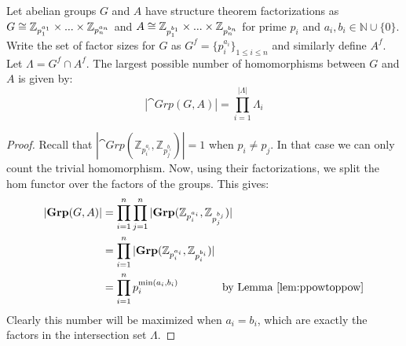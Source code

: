 \begin{lemma}
Let abelian groups $G$ and $A$ have structure theorem factorizations as $G\cong\mathbb{Z}_{p_1^{a_1}} \times ...\times\mathbb{Z}_{p_n^{a_n}}$ and $A\cong\mathbb{Z}_{p_1^{b_1}} \times ...\times\mathbb{Z}_{p_n^{b_n}}$ for prime $p_i$ and $a_i,b_i\in \mathbb{N}\cup\{0\}$. Write the set of factor sizes for $G$ as $G^f = \{p_i^{a_i}\}_{1\le i\le n}$ and similarly define $A^f$. Let $\Lambda = G^f\cap A^f$. The largest possible number of homomorphisms between $G$ and $A$ is given by:
\begin{equation}
|\cat{Grp}(G,A)| = \prod_{i=1}^{|\Lambda|}\Lambda_i
\end{equation}
\end{lemma}
\begin{proof}
Recall that $|\cat{Grp}\left(\mathbb{Z}_{p_i^{a_i}},\mathbb{Z}_{p_j^{b_i}}\right)|=1$ when $p_i\neq p_j$. In that case we can only count the trivial homomorphism. Now, using their factorizations, we split the hom functor over the factors of the groups. This gives:
\begin{align}
|\mathbf{Grp}(G,A)| &= \prod_{i=1}^n\prod_{j=1}^n|\mathbf{Grp}(\mathbb{Z}_{p_i^{a_i}},\mathbb{Z}_{p_j^{b_j}})|
\\ &= \prod_{i=1}^n|\mathbf{Grp}(\mathbb{Z}_{p_i^{a_i}},\mathbb{Z}_{p_i^{b_i}})|
\\ &= \prod_{i=1}^np_i^{\min(a_i,b_i)} \qquad \qquad \mbox{by Lemma \ref{lem:ppowtoppow}}
\end{align}
Clearly this number will be maximized when $a_i=b_i$, which are exactly the factors in the intersection set $\Lambda$.
\end{proof}

